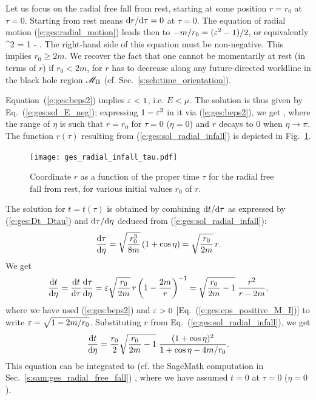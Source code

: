 Let us focus on the radial free fall from rest, starting at some
position $r=r_0$ at $\tau=0$. Starting from rest
means $\mathrm{d} r/\mathrm{d}\tau = 0$ at $\tau=0$. The equation of radial motion
(\ref{e:ges:radial_motion}) leads then to $-m/r_0 = (\varepsilon^2 - 1)/2$,
or equivalently
\be \label{e:ges:beps2}
         \veps^2 = 1 -  .
\ee
The right-hand side of this equation must be non-negative. This implies
$r_0\geq 2m$. We recover the fact that one cannot be momentarily at rest
(in terms of $r$) if $r_0<2m$, for $r$ has to decrease along any future-directed
worldline in the black hole region $\mathscr{M}_{\rm II}$ (cf. Sec.~\ref{s:sch:time_orientation}).

Equation~(\ref{e:ges:beps2}) implies $\varepsilon < 1$, i.e. $E < \mu$. The solution
is thus given by Eq.~(\ref{e:ges:sol_E_neg}); expressing $1-\varepsilon^2$
in it via (\ref{e:ges:beps2}), we get
\be \label{e:ges:sol_radial_infall}
     \leq \eta \leq \pi ,
\ee
where the range of $\eta$ is such that $r=r_0$ for $\tau=0$ ($\eta=0$) and
$r$ decays to $0$ when $\eta\to \pi$. The function $r(\tau)$ resulting
from (\ref{e:ges:sol_radial_infall}) is depicted in
Fig.~\ref{f:ges:radial_infall_tau}.

\begin{figure}
\centerline{\texttt{[image: ges\_radial\_infall\_tau.pdf]}}
\caption[]{\label{f:ges:radial_infall_tau} \footnotesize
Coordinate $r$ as a function of the proper time $\tau$
for the radial free fall from rest, for various initial values $r_0$ of $r$.}
\end{figure}

The solution for $t=t(\tau)$ is obtained by combining $\mathrm{d} t/\mathrm{d}\tau$ as expressed
by (\ref{e:ges:Dt_Dtau}) and $\mathrm{d}\tau/\mathrm{d}\eta$ deduced from (\ref{e:ges:sol_radial_infall}):
\[
    \frac{\mathrm{d}\tau}{\mathrm{d}\eta} = \sqrt{\frac{r_0^3}{8 m}}  \left( 1 + \cos\eta \right)
        = \sqrt{\frac{r_0}{2m}} \, r .
\]
We get
\[
    \frac{\mathrm{d} t}{\mathrm{d}\eta} =  \frac{\mathrm{d} t}{\mathrm{d}\tau} \frac{\mathrm{d}\tau}{\mathrm{d}\eta}
        = \varepsilon \sqrt{\frac{r_0}{2m}} \, r \left(1 - \frac{2m}{r} \right) ^{-1}
        = \sqrt{\frac{r_0}{2m} - 1} \; \frac{r^2}{r - 2m} ,
\]
where we have used (\ref{e:ges:beps2}) and $\varepsilon > 0$ [Eq.~(\ref{e:ges:eps_positive_M_I})]
to write
$\varepsilon = \sqrt{1-2m/r_0}$.
Substituting $r$ from Eq.~(\ref{e:ges:sol_radial_infall}), we get
\[
    \frac{\mathrm{d} t}{\mathrm{d}\eta} =   \frac{r_0}{2} \sqrt{\frac{r_0}{2m} - 1} \;
        \frac{(1+\cos\eta)^2}{1+\cos\eta - 4m/r_0} .
\]
This equation can be integrated to (cf. the \textsf{SageMath} computation in Sec.~\ref{s:sam:ges_radial_free_fall})
\be \label{e:ges:sol_t_radial_infall}
    ,
\ee
where we have assumed $t=0$ at $\tau=0$ ($\eta=0$).

